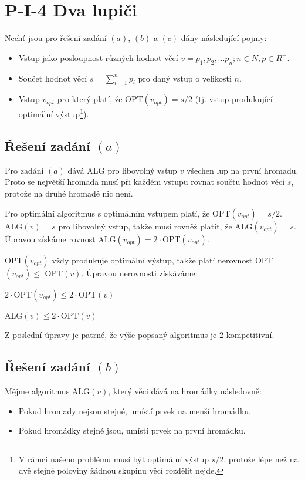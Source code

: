 \documentclass[a4paper, 12pt]{article}
\begin{document}
  \section{P-I-4 Dva lupiči}
  Nechť jsou pro řešení zadání $(a)$, $(b)$ a $(c)$ dány následující pojmy:
  \begin{itemize}[noitemsep]
    \item Vstup jako posloupnost různých hodnot věcí $v=p_1, p_2,...p_n;n \in N, p \in R^+$.
    \item Součet hodnot věcí $s=\sum\limits_{i=1}^n p_i$ pro daný vstup o velikosti $n$.
    \item Vstup $v_{opt}$ pro který platí, že OPT$(v_{opt})=s/2$ (tj. vstup produkující optimální výstup\footnote{\label{note1}V rámci našeho problému musí být optimální výstup $s/2$, protože lépe než na dvě stejné poloviny žádnou skupinu věcí rozdělit nejde.}).
  \end{itemize}

  \subsection{Řešení zadání $(a)$}
  Pro zadání $(a)$ dává ALG pro libovolný vstup $v$ všechen lup na první hromadu. Proto se největší hromada musí při každém vstupu rovnat součtu hodnot věcí $s$, protože na druhé hromadě nic není.

  Pro optimální algoritmus s optimálním vstupem platí, že OPT$(v_{opt})=s/2$.
  ALG$(v)=s$ pro libovolný vstup, takže musí rovněž platit, že ALG$(v_{opt})=s$. Úpravou získáme rovnost ALG$(v_{opt}) = 2 \cdot$OPT$(v_{opt})$.

  OPT$(v_{opt})$ vždy produkuje optimální výstup\footnotemark[\ref{note1}], takže platí nerovnost OPT$(v_{opt}) \le$ OPT$(v)$. Úpravou nerovnosti získáváme:

  \begin{center}
    $2 \cdot$OPT$(v_{opt}) \le 2\cdot$OPT$(v)$

    ALG$(v) \le 2 \cdot$OPT$(v)$
  \end{center}

  Z poslední úpravy je patrné, že výše popsaný algoritmus je 2-kompetitivní.

  \subsection{Řešení zadání $(b)$}
  Mějme algoritmus ALG$(v)$, který věci dává na hromádky následovně:
  \begin{itemize}[noitemsep, topsep=0pt]
    \item Pokud hromady nejsou stejné, umístí prvek na menší hromádku.
    \item Pokud hromádky stejné jsou, umístí prvek na první hromádku.
  \end{itemize}
\end{document}
